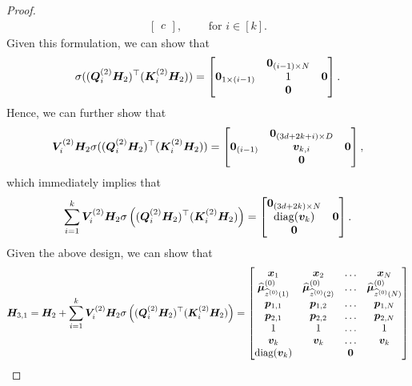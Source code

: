 \begin{proof}
\begin{align*}
\begin{bmatrix}
        c
    \end{bmatrix},\qquad\text{ for }i\in[k].
\end{align*}
Given this formulation, we can show that
\begin{align*}
    \sigma((\boldsymbol{Q}_i^{(2)}\boldsymbol{H}_2)^\top(\boldsymbol{K}_i^{(2)}\boldsymbol{H}_2)) = \begin{bmatrix}
        &\boldsymbol{0}_{(i-1)\times N}&\\
        \boldsymbol{0}_{1\times(i-1)}&1&\boldsymbol{0}\\
        &\boldsymbol{0}&
    \end{bmatrix}.
\end{align*}
Hence, we can further show that
\begin{align*}
    \boldsymbol{V}_{i}^{(2)}\boldsymbol{H}_2\sigma((\boldsymbol{Q}_i^{(2)}\boldsymbol{H}_2)^\top(\boldsymbol{K}_i^{(2)}\boldsymbol{H}_2))=\begin{bmatrix}
        &\boldsymbol{0}_{(3d+2k+i)\times D}&\\
        \boldsymbol{0}_{(i-1)}&\boldsymbol{v}_{k,i}&\boldsymbol{0}\\
        &\boldsymbol{0}&
    \end{bmatrix},
\end{align*}
which immediately implies that
\begin{align*}
    \sum_{i=1}^k\boldsymbol{V}_i^{(2)}\boldsymbol{H}_2\sigma\left((\boldsymbol{Q}_i^{(2)}\boldsymbol{H}_2)^\top(\boldsymbol{K}_i^{(2)}\boldsymbol{H}_2)\right)=\begin{bmatrix}
        \boldsymbol{0}_{(3d+2k)\times N}&\\
        \text{diag}(\boldsymbol{v}_k)&\boldsymbol{0}\\
        \boldsymbol{0}
    \end{bmatrix}.
\end{align*}
Given the above design, we can show that
\begin{align*}
    \boldsymbol{H}_{3,1}=\boldsymbol{H}_2+\sum_{i=1}^k\boldsymbol{V}_i^{(2)}\boldsymbol{H}_2\sigma\left((\boldsymbol{Q}_i^{(2)}\boldsymbol{H}_2)^\top(\boldsymbol{K}_i^{(2)}\boldsymbol{H}_2)\right)=\begin{bmatrix}
        \boldsymbol{x}_1&\boldsymbol{x}_2&\ldots&\boldsymbol{x}_N\\
        \widehat{\boldsymbol{\mu}}_{\widehat{z}^{(0)}(1)}^{(0)}&\widehat{\boldsymbol{\mu}}_{\widehat{z}^{(0)}(2)}^{(0)}&\ldots&\widehat{\boldsymbol{\mu}}_{\widehat{z}^{(0)}(N)}^{(0)}\\
        \boldsymbol{p}_{1,1}&\boldsymbol{p}_{1,2}&\ldots&\boldsymbol{p}_{1,N}\\
        \boldsymbol{p}_{2,1}&\boldsymbol{p}_{2,2}&\ldots&\boldsymbol{p}_{2,N}\\
        1&1&\ldots&1\\
        \boldsymbol{v}_k&\boldsymbol{v}_k&\ldots&\boldsymbol{v}_k\\
        \text{diag}(\boldsymbol{v}_k)&&\boldsymbol{0}&\\

\end{bmatrix}
\end{align*}
\end{proof}
